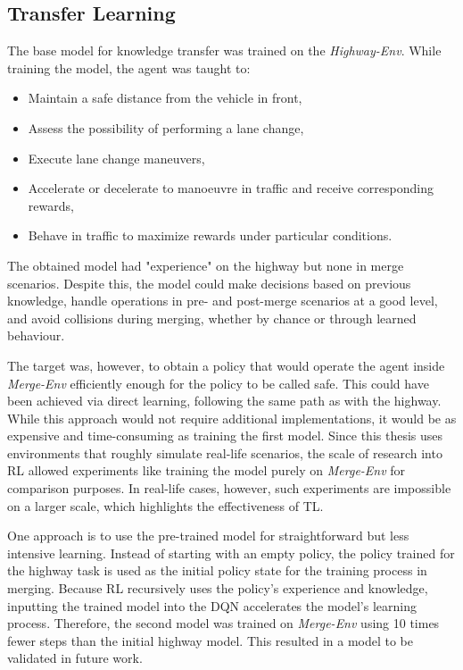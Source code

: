 \subsection{Transfer Learning}\label{sec:transfer_learning}

The base model for knowledge transfer was trained on the \emph{Highway-Env}. While training the model, the agent was taught to:
\begin{itemize}
    \item Maintain a safe distance from the vehicle in front,
    \item Assess the possibility of performing a lane change,
    \item Execute lane change maneuvers,
    \item Accelerate or decelerate to manoeuvre in traffic and receive corresponding rewards,
    \item Behave in traffic to maximize rewards under particular conditions.
\end{itemize}

The obtained model had "experience" on the highway but none in merge scenarios. Despite this, the model could make decisions based on previous knowledge, handle operations in pre- and post-merge scenarios at a good level, and avoid collisions during merging, whether by chance or through learned behaviour. 

The target was, however, to obtain a policy that would operate the agent inside \emph{Merge-Env} efficiently enough for the policy to be called safe. This could have been achieved via direct learning, following the same path as with the highway. While this approach would not require additional implementations, it would be as expensive and time-consuming as training the first model. Since this thesis uses environments that roughly simulate real-life scenarios, the scale of research into RL allowed experiments like training the model purely on \emph{Merge-Env} for comparison purposes. In real-life cases, however, such experiments are impossible on a larger scale, which highlights the effectiveness of TL.

One approach is to use the pre-trained model for straightforward but less intensive learning. Instead of starting with an empty policy, the policy trained for the highway task is used as the initial policy state for the training process in merging. Because RL recursively uses the policy's experience and knowledge, inputting the trained model into the DQN accelerates the model’s learning process. Therefore, the second model was trained on \emph{Merge-Env} using 10 times fewer steps than the initial highway model. This resulted in a model to be validated in future work.


